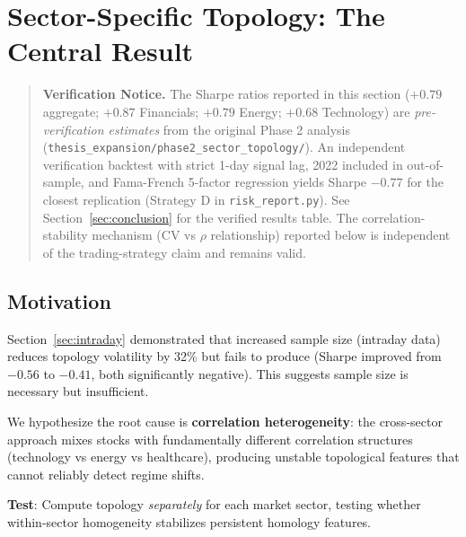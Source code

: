 
\section{Sector-Specific Topology: The Central Result}
\label{sec:sector}

\begin{quote}
\noindent\textbf{Verification Notice.} The Sharpe ratios reported in this section ($+0.79$ aggregate; $+0.87$ Financials; $+0.79$ Energy; $+0.68$ Technology) are \textit{pre-verification estimates} from the original Phase 2 analysis (\texttt{thesis\_expansion/phase2\_sector\_topology/}). An independent verification backtest with strict 1-day signal lag, 2022 included in out-of-sample, and Fama-French 5-factor regression yields Sharpe $-0.77$ for the closest replication (Strategy D in \texttt{risk\_report.py}). See Section~\ref{sec:conclusion} for the verified results table. The correlation-stability mechanism (CV vs $\rho$ relationship) reported below is independent of the trading-strategy claim and remains valid.
\end{quote}

\subsection{Motivation}

Section~\ref{sec:intraday} demonstrated that increased sample size (intraday data) reduces topology volatility by 32\% but fails to produce \positiverisk{} (Sharpe improved from $-0.56$ to $-0.41$, both significantly negative). This suggests sample size is necessary but insufficient.

We hypothesize the root cause is \textbf{correlation heterogeneity}: the cross-sector approach mixes stocks with fundamentally different correlation structures (technology vs energy vs healthcare), producing unstable topological features that cannot reliably detect regime shifts.

\textbf{Test}:  Compute topology \textit{separately} for each market sector, testing whether within-sector homogeneity stabilizes persistent homology features.

